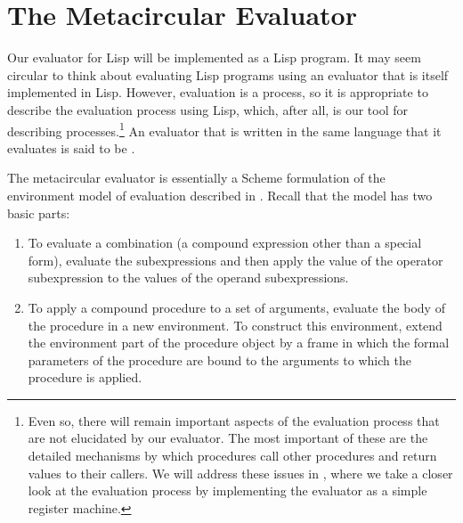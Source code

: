 \section{The Metacircular Evaluator}
\label{Section 4.1}

Our evaluator for Lisp will be implemented as a Lisp program.  It may seem
circular to think about evaluating Lisp programs using an evaluator that is
itself implemented in Lisp.  However, evaluation is a process, so it is
appropriate to describe the evaluation process using Lisp, which, after all, is
our tool for describing processes.\footnote{Even so, there will remain
important aspects of the evaluation process that are not elucidated by our
evaluator.  The most important of these are the detailed mechanisms by which
procedures call other procedures and return values to their callers.  We will
address these issues in , where we take a closer look at the
evaluation process by implementing the evaluator as a simple register machine.}
An evaluator that is written in the same language that it evaluates is said to
be .

The metacircular evaluator is essentially a Scheme formulation of the
environment model of evaluation described in .  Recall that
the model has two basic parts:

\begin{enumerate}

\item
To evaluate a combination (a compound expression other than a special form),
evaluate the subexpressions and then apply the value of the operator
subexpression to the values of the operand subexpressions.

\item
To apply a compound procedure to a set of arguments, evaluate the body of the
procedure in a new environment.  To construct this environment, extend the
environment part of the procedure object by a frame in which the formal
parameters of the procedure are bound to the arguments to which the procedure
is applied.

\end{enumerate}

